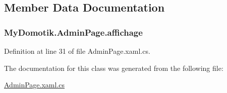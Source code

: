 \subsection{Member Data Documentation}
\subsubsection[{\texorpdfstring{affichage}{affichage}}]{ My\+Domotik.\+Admin\+Page.\+affichage\hspace{0.3cm}{\ttfamily [private]}}\hypertarget{class_my_domotik_1_1_admin_page_a3653a24ede0989f52591c70ea6d7014c}{}\label{class_my_domotik_1_1_admin_page_a3653a24ede0989f52591c70ea6d7014c}


Definition at line 31 of file Admin\+Page.\+xaml.\+cs.



The documentation for this class was generated from the following file\+:\begin{DoxyCompactItemize}
\item 
\hyperlink{_admin_page_8xaml_8cs}{Admin\+Page.\+xaml.\+cs}\end{DoxyCompactItemize}
